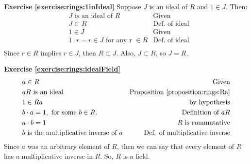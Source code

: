 
\noindent\textbf{Exercise \ref{exercise:rings:1inIdeal}}
Suppose $J$ is an ideal of $R$ and $1\in J$.  Then:
\begin{align*}
&J \text { is an ideal of } R & \text{Given}\\
&J\subset R & \text{Def. of ideal}\\
&1\in J & \text{Given}\\
&1\cdot r=r\in J \text{ for any r }\in R & \text{Def. of ideal}\\
\end{align*}
Since $r\in R$ implies $r\in J$, then $R\subset J$.  Also, $J\subset R$, so $J=R$.

\noindent\textbf{Exercise \ref{exercise:rings:idealField}}
\begin{align*}
&a\in R & \text{Given}\\
&aR \text{ is an ideal} & \text{Proposition }\ref{proposition:rings:Ra}\\
&1\in Ra & \text{by hypothesis}\\
&b\cdot a=1, \text{ for some } b\in R. & \text{Definition of $aR$}\\
&\text{$a\cdot b=1$} & \text{$R$ is commutative}\\
&\text{$b$ is the multiplicative inverse of $a$} & \text{Def. of multiplicative inverse}\\
\end{align*}
Since $a$ was an arbitrary element of $R$, then we can say that every element of $R$ has a multiplicative inverse in $R$.  So, $R$ is a field.























